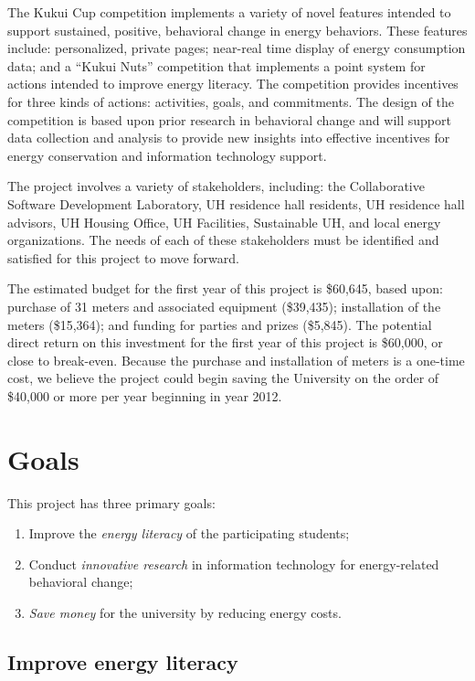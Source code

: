\documentclass[11pt]{article}
\begin{document}
The Kukui Cup competition implements a variety of novel
features intended to support sustained, positive, behavioral change in
energy behaviors.  These features include: personalized, private pages;
near-real time display of energy consumption data; and a ``Kukui Nuts''
competition that implements a point system for actions intended to improve
energy literacy.  The competition provides incentives for three kinds of
actions: activities, goals, and commitments.  The design of the competition
is based upon prior research in behavioral change and will support data
collection and analysis to provide new insights into effective incentives
for energy conservation and information technology support.

The project involves a variety of stakeholders, including: the
Collaborative Software Development Laboratory, UH residence hall residents, UH 
residence hall advisors, UH Housing Office, UH Facilities, Sustainable UH, and
local energy organizations.  The needs of each of these stakeholders must
be identified and satisfied for this project to move forward.

The estimated budget for the first year of this project is \$60,645, based
upon: purchase of 31 meters and associated equipment (\$39,435);
installation of the meters (\$15,364); and funding for parties and prizes
(\$5,845).  The potential direct return on this investment for the first
year of this project is \$60,000, or close to break-even.  Because the
purchase and installation of meters is a one-time cost, we believe the
project could begin saving the University on the order of \$40,000 or more
per year beginning in year 2012.


\newpage
\section{Goals}

This project has three primary goals:
\begin{enumerate}
\item Improve the {\em energy literacy} of the participating students;
\item Conduct {\em innovative research} in information technology for
  energy-related behavioral change;
\item {\em Save money} for the university by reducing energy costs.
\end{enumerate}

\subsection{Improve energy literacy}
\end{document}
